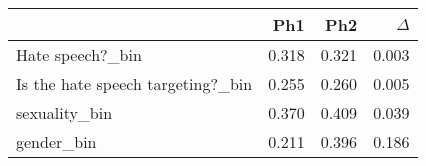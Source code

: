 \begin{tabular}{lrrr}
\toprule
 & Ph1 & Ph2 & $\Delta$ \\
\midrule
Hate speech?_bin & 0.318 & 0.321 & 0.003 \\
Is the hate speech targeting?_bin & 0.255 & 0.260 & 0.005 \\
sexuality_bin & 0.370 & 0.409 & 0.039 \\
gender_bin & 0.211 & 0.396 & 0.186 \\
\bottomrule
\end{tabular}
